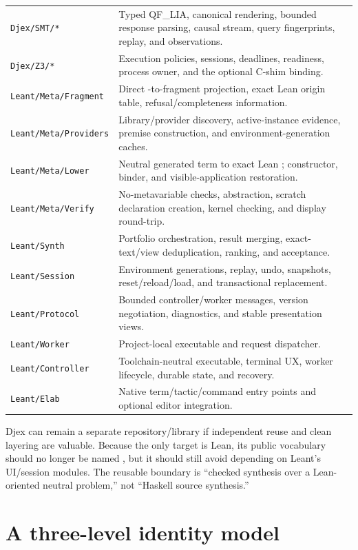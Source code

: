 \documentclass[10pt,letterpaper,oneside]{report}
\newcommand{\code}[1]{\texttt{\detokenize{#1}}}
\newcommand{\filepath}[1]{\nolinkurl{#1}}
\begin{document}
\begin{longtable}{@{}L{0.31\textwidth}L{0.61\textwidth}@{}}
\filepath{Djex/SMT/*} & Typed QF\_LIA, canonical rendering, bounded response parsing, causal stream, query fingerprints, replay, and observations. \\
\filepath{Djex/Z3/*} & Execution policies, sessions, deadlines, readiness, process owner, and the optional C-shim binding. \\
\filepath{Leant/Meta/Fragment} & Direct \code{Expr}-to-fragment projection, exact Lean origin table, refusal/completeness information. \\
\filepath{Leant/Meta/Providers} & Library/provider discovery, active-instance evidence, premise construction, and environment-generation caches. \\
\filepath{Leant/Meta/Lower} & Neutral generated term to exact Lean \code{Expr}; constructor, binder, and visible-application restoration. \\
\filepath{Leant/Meta/Verify} & No-metavariable checks, abstraction, scratch declaration creation, kernel checking, and display round-trip. \\
\filepath{Leant/Synth} & Portfolio orchestration, result merging, exact-text/view deduplication, ranking, and acceptance. \\
\filepath{Leant/Session} & Environment generations, replay, undo, snapshots, reset/reload/load, and transactional replacement. \\
\filepath{Leant/Protocol} & Bounded controller/worker messages, version negotiation, diagnostics, and stable presentation views. \\
\filepath{Leant/Worker} & Project-local executable and request dispatcher. \\
\filepath{Leant/Controller} & Toolchain-neutral executable, terminal UX, worker lifecycle, durable state, and recovery. \\
\filepath{Leant/Elab} & Native term/tactic/command entry points and optional editor integration. \\
\bottomrule
\end{longtable}

Djex can remain a separate repository/library if independent reuse and clean layering are valuable. Because the only target is Lean, its public vocabulary should no longer be named \code{Language.Haskell.*}, but it should still avoid depending on Leant's UI/session modules. The reusable boundary is ``checked synthesis over a Lean-oriented neutral problem,'' not ``Haskell source synthesis.''

\section{A three-level identity model}
\end{document}

